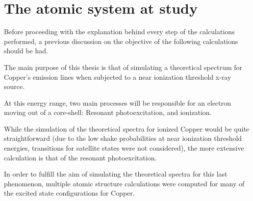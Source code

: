 % 
%  


\section{The atomic system at study}

Before proceeding with the explanation behind every step of the calculations performed, a previous discussion on the objective of the following calculations should be had.


The main purpose of this thesis is that of simulating a theoretical spectrum for Copper's emission lines when subjected to a near ionization threshold x-ray source.

At this energy range, two main processes will be responsible for an electron moving out of a core-shell: Resonant photoexcitation, and ionization.

While the simulation of the theoretical spectra for ionized Copper would be quite straightforward (due to the low shake probabilities at near ionization threshold energies, transitions for satellite states were not considered), the more extensive calculation is that of the resonant photoexcitation.

In order to fulfill the aim of simulating the theoretical spectra for this last phenomenon, multiple atomic structure calculations were computed for many of the excited state configurations for Copper.

